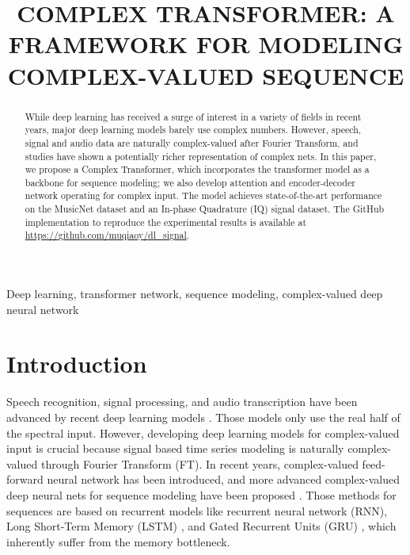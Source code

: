 \documentclass{article}
\title{COMPLEX TRANSFORMER: A FRAMEWORK FOR MODELING COMPLEX-VALUED SEQUENCE}
\begin{document}
\topmargin=0mm
\maketitle
\begin{abstract}
While deep learning has received a surge of interest in a variety of fields in recent years, major deep learning models barely use complex numbers. However, speech, signal and audio data are naturally complex-valued after Fourier Transform, and studies have shown a potentially richer representation of complex nets. In this paper, we propose a Complex Transformer, which incorporates the transformer model as a backbone for sequence modeling; we also develop attention and encoder-decoder network operating for complex input. The model achieves state-of-the-art performance on the MusicNet dataset and an In-phase Quadrature (IQ) signal dataset. The GitHub implementation to reproduce the experimental results is available at \url{https://github.com/muqiaoy/dl_signal}.
\end{abstract}
\begin{keywords}
Deep learning, transformer network, sequence modeling, complex-valued deep neural network
\end{keywords}
\section{Introduction}
\label{sec:intro}
Speech recognition, signal processing, and audio transcription have been advanced by recent deep learning models \cite{amodei2016deep, oord2016wavenet}. Those models only use the real half of the spectral input. However, developing deep learning models for complex-valued input is crucial because signal based time series modeling is naturally complex-valued through Fourier Transform (FT). In recent years, complex-valued feed-forward neural network \cite{hirose2003complex, amin2009single} has been introduced, and more advanced complex-valued deep neural nets for sequence modeling have been proposed \cite{arjovsky2016unitary, danihelka2016associative, wolter2018complex, wolterfrnn}. Those methods for sequences are based on recurrent models like recurrent neural network (RNN), Long Short-Term Memory (LSTM) \cite{hochreiter1997long}, and Gated Recurrent Units (GRU) \cite{cho2014learning}, which inherently suffer from the memory bottleneck.
\end{document}
